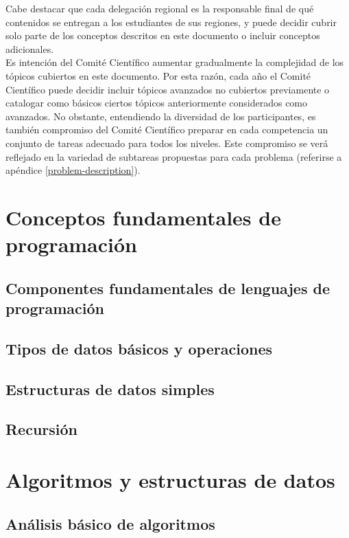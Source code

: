 \documentclass{article}
\begin{document}
Cabe destacar que cada delegación regional es la responsable final de qué
contenidos se entregan a los estudiantes de sus regiones, y puede decidir cubrir
solo parte de los conceptos descritos en este documento o incluir conceptos
adicionales.\\

Es intención del Comité Científico aumentar gradualmente la complejidad de los
tópicos cubiertos en este documento.
Por esta razón, cada año el Comité Científico puede decidir incluir tópicos
avanzados no cubiertos previamente o catalogar como básicos ciertos tópicos
anteriormente considerados como avanzados.
No obstante, entendiendo la diversidad de los participantes, es también
compromiso del Comité Científico preparar en cada competencia un conjunto de
tareas adecuado para todos los niveles.
Este compromiso se verá reflejado en la variedad de subtareas propuestas para cada
problema (referirse a apéndice \ref{problem-description}).

\section{Conceptos fundamentales de programación}

\subsection{Componentes fundamentales de lenguajes de programación}


\subsection{Tipos de datos básicos y operaciones}


\subsection{Estructuras de datos simples}


\subsection{Recursión}


\section{Algoritmos y estructuras de datos}
\subsection{Análisis básico de algoritmos}
\label{algorithm-analysis}

\end{document}

